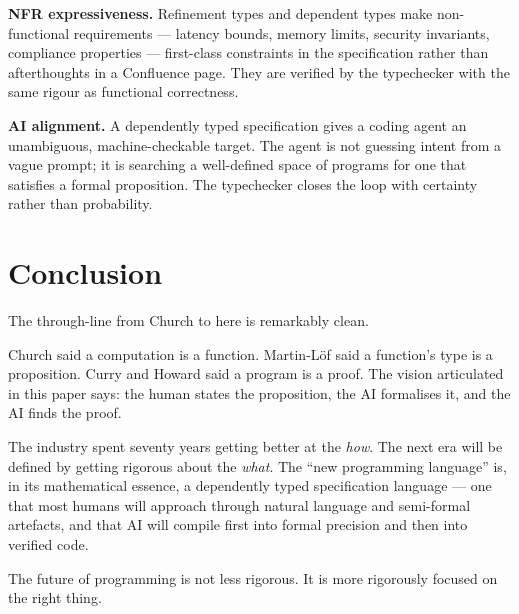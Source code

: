 \documentclass[12pt]{article}
\begin{document}
\textbf{NFR expressiveness.} Refinement types and dependent types make
non-functional requirements --- latency bounds, memory limits, security
invariants, compliance properties --- first-class constraints in the
specification rather than afterthoughts in a Confluence page. They are
verified by the typechecker with the same rigour as functional correctness.

\textbf{AI alignment.} A dependently typed specification gives a coding agent
an unambiguous, machine-checkable target. The agent is not guessing intent
from a vague prompt; it is searching a well-defined space of programs for one
that satisfies a formal proposition. The typechecker closes the loop with
certainty rather than probability.

\section{Conclusion}

The through-line from Church to here is remarkably clean.

Church said a computation is a function. Martin-L\"{o}f said a function's
type is a proposition. Curry and Howard said a program is a proof. The vision
articulated in this paper says: the human states the proposition, the AI
formalises it, and the AI finds the proof.

The industry spent seventy years getting better at the \emph{how}. The next
era will be defined by getting rigorous about the \emph{what}. The ``new
programming language'' is, in its mathematical essence, a dependently typed
specification language --- one that most humans will approach through natural
language and semi-formal artefacts, and that AI will compile first into formal
precision and then into verified code.

The future of programming is not less rigorous. It is more rigorously focused
on the right thing.
\end{document}
